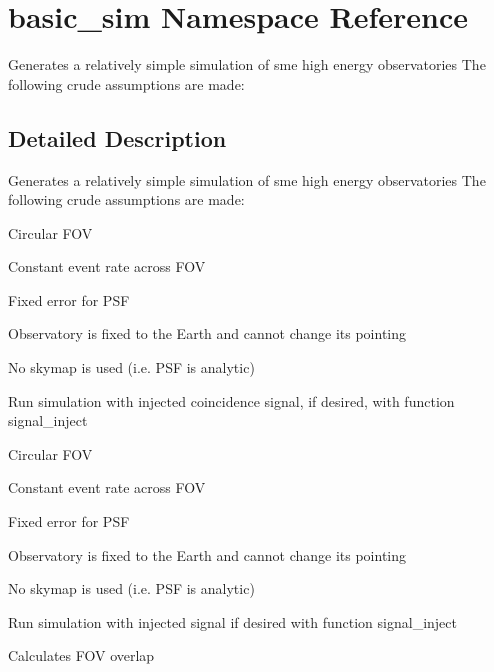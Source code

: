 \hypertarget{namespacebasic__sim}{\section{basic\-\_\-sim Namespace Reference}
\label{namespacebasic__sim}
}


\begin{DoxyVerb} Generates a relatively simple simulation of sme high energy observatories
 The following crude assumptions are made:
\end{DoxyVerb}
  




\subsection{Detailed Description}
\begin{DoxyVerb} Generates a relatively simple simulation of sme high energy observatories
 The following crude assumptions are made:
\end{DoxyVerb}
 
\begin{DoxyEnumerate}
\item Circular F\-O\-V
\item Constant event rate across F\-O\-V
\item Fixed error for P\-S\-F
\item Observatory is fixed to the Earth and cannot change its pointing
\item No skymap is used (i.\-e. P\-S\-F is analytic)
\item Run simulation with injected coincidence signal, if desired, with function signal\-\_\-inject
\end{DoxyEnumerate}
\begin{DoxyEnumerate}
\item Circular F\-O\-V
\item Constant event rate across F\-O\-V
\item Fixed error for P\-S\-F
\item Observatory is fixed to the Earth and cannot change its pointing
\item No skymap is used (i.\-e. P\-S\-F is analytic)
\item Run simulation with injected signal if desired with function signal\-\_\-inject
\item Calculates F\-O\-V overlap 
\end{DoxyEnumerate}